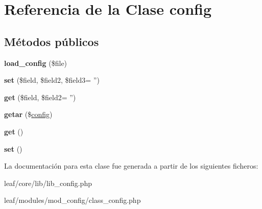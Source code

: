 \hypertarget{classconfig}{\section{Referencia de la Clase config}
\label{classconfig}
}
\subsection*{Métodos públicos}
\begin{DoxyCompactItemize}
\item 
\hypertarget{classconfig_a8cbdce3df58f9387504463fc8bdce49b}{{\bfseries load\-\_\-config} (\$file)}\label{classconfig_a8cbdce3df58f9387504463fc8bdce49b}

\item 
\hypertarget{classconfig_ad79156f996f6a7dda9c351cd04cdd90e}{{\bfseries set} (\$field, \$field2, \$field3= '')}\label{classconfig_ad79156f996f6a7dda9c351cd04cdd90e}

\item 
\hypertarget{classconfig_a00cfcd6dd3853ed5fa4b51c96dd84a94}{{\bfseries get} (\$field, \$field2= '')}\label{classconfig_a00cfcd6dd3853ed5fa4b51c96dd84a94}

\item 
\hypertarget{classconfig_a6cac0b52ce92c9bc3b126ab97e678afe}{{\bfseries getar} (\$\hyperlink{classconfig}{config})}\label{classconfig_a6cac0b52ce92c9bc3b126ab97e678afe}

\item 
\hypertarget{classconfig_ac33ee765f5ad9f134540bac393721cfe}{{\bfseries get} ()}\label{classconfig_ac33ee765f5ad9f134540bac393721cfe}

\item 
\hypertarget{classconfig_a89f017a6c12e98acec0d6833ea9c8994}{{\bfseries set} ()}\label{classconfig_a89f017a6c12e98acec0d6833ea9c8994}

\end{DoxyCompactItemize}


La documentación para esta clase fue generada a partir de los siguientes ficheros\-:\begin{DoxyCompactItemize}
\item 
leaf/core/lib/lib\-\_\-config.\-php\item 
leaf/modules/mod\-\_\-config/class\-\_\-config.\-php\end{DoxyCompactItemize}
